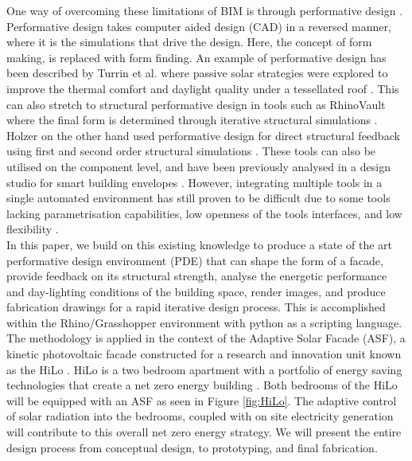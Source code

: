 One way of overcoming these limitations of BIM is through performative design \cite{oxman2008performance}. Performative design takes computer aided design (CAD) in a reversed manner, where it is the simulations that drive the design. Here, the concept of form making, is replaced with form finding. An example of performative design has been described by Turrin et al. where passive solar strategies were explored to improve the thermal comfort and daylight quality under a tessellated roof \cite{turrin2012performative}. This can also stretch to structural performative design in tools such as RhinoVault where the final form is determined through iterative structural simulations \cite{Rippmann2012}. Holzer on the other hand used performative design for direct structural feedback using first and second order structural simulations \cite{holzer2016design}. These tools can also be utilised on the component level, and have been previously analysed in a design studio for smart building envelopes \cite{kim2017exploratory}. However, integrating multiple tools in a single automated environment has still proven to be difficult due to some tools lacking parametrisation capabilities, low openness of the tools interfaces, and low flexibility \cite{diaz2017multidisciplinary,negendahl2015building}.\\

In this paper, we build on this existing knowledge to produce a state of the art performative design environment (PDE) that can shape the form of a facade, provide feedback on its structural strength, analyse the energetic performance and day-lighting conditions of the building space, render images, and produce fabrication drawings for a rapid iterative design process. This is accomplished within the Rhino/Grasshopper environment with python as a scripting language. The methodology is applied in the context of the Adaptive Solar Facade (ASF), a kinetic photovoltaic facade constructed for a research and innovation unit known as the HiLo \cite{Block2017}. HiLo is a two bedroom apartment with a portfolio of energy saving technologies that create a net zero energy building \cite{lydon2017coupling}. Both bedrooms of the HiLo will be equipped with an ASF as seen in Figure \ref{fig:HiLo}. The adaptive control of solar radiation into the bedrooms, coupled with on site electricity generation will contribute to this overall net zero energy strategy.  We will present the entire design process from conceptual design, to prototyping, and final fabrication. 




